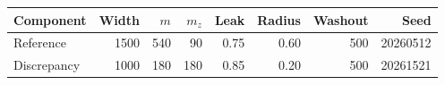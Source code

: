 \begin{tabular}{@{}lrrrrrrr@{}}
\toprule
Component & Width & \(m\) & \(m_z\) & Leak & Radius & Washout & Seed \\
\midrule
Reference & 1500 & 540 & 90 & 0.75 & 0.60 & 500 & 20260512 \\
Discrepancy & 1000 & 180 & 180 & 0.85 & 0.20 & 500 & 20261521 \\
\bottomrule
\end{tabular}
